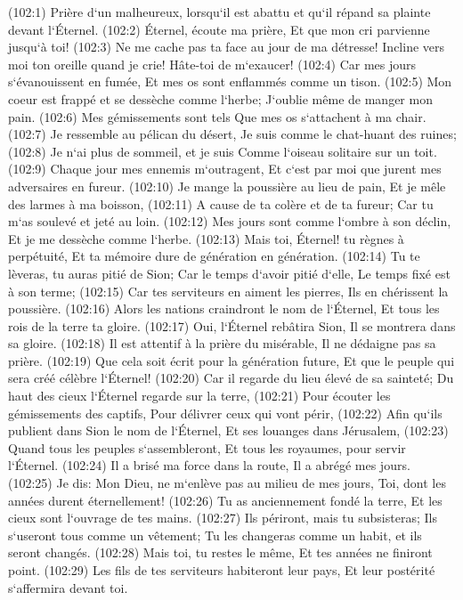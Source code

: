\verse (102:1) Prière d`un malheureux, lorsqu`il est abattu et qu`il répand sa plainte devant l`Éternel. (102:2) Éternel, écoute ma prière, Et que mon cri parvienne jusqu`à toi! 
\verse (102:3) Ne me cache pas ta face au jour de ma détresse! Incline vers moi ton oreille quand je crie! Hâte-toi de m`exaucer! 
\verse (102:4) Car mes jours s`évanouissent en fumée, Et mes os sont enflammés comme un tison. 
\verse (102:5) Mon coeur est frappé et se dessèche comme l`herbe; J`oublie même de manger mon pain. 
\verse (102:6) Mes gémissements sont tels Que mes os s`attachent à ma chair. 
\verse (102:7) Je ressemble au pélican du désert, Je suis comme le chat-huant des ruines; 
\verse (102:8) Je n`ai plus de sommeil, et je suis Comme l`oiseau solitaire sur un toit. 
\verse (102:9) Chaque jour mes ennemis m`outragent, Et c`est par moi que jurent mes adversaires en fureur. 
\verse (102:10) Je mange la poussière au lieu de pain, Et je mêle des larmes à ma boisson, 
\verse (102:11) A cause de ta colère et de ta fureur; Car tu m`as soulevé et jeté au loin. 
\verse (102:12) Mes jours sont comme l`ombre à son déclin, Et je me dessèche comme l`herbe. 
\verse (102:13) Mais toi, Éternel! tu règnes à perpétuité, Et ta mémoire dure de génération en génération. 
\verse (102:14) Tu te lèveras, tu auras pitié de Sion; Car le temps d`avoir pitié d`elle, Le temps fixé est à son terme; 
\verse (102:15) Car tes serviteurs en aiment les pierres, Ils en chérissent la poussière. 
\verse (102:16) Alors les nations craindront le nom de l`Éternel, Et tous les rois de la terre ta gloire. 
\verse (102:17) Oui, l`Éternel rebâtira Sion, Il se montrera dans sa gloire. 
\verse (102:18) Il est attentif à la prière du misérable, Il ne dédaigne pas sa prière. 
\verse (102:19) Que cela soit écrit pour la génération future, Et que le peuple qui sera créé célèbre l`Éternel! 
\verse (102:20) Car il regarde du lieu élevé de sa sainteté; Du haut des cieux l`Éternel regarde sur la terre, 
\verse (102:21) Pour écouter les gémissements des captifs, Pour délivrer ceux qui vont périr, 
\verse (102:22) Afin qu`ils publient dans Sion le nom de l`Éternel, Et ses louanges dans Jérusalem, 
\verse (102:23) Quand tous les peuples s`assembleront, Et tous les royaumes, pour servir l`Éternel. 
\verse (102:24) Il a brisé ma force dans la route, Il a abrégé mes jours. 
\verse (102:25) Je dis: Mon Dieu, ne m`enlève pas au milieu de mes jours, Toi, dont les années durent éternellement! 
\verse (102:26) Tu as anciennement fondé la terre, Et les cieux sont l`ouvrage de tes mains. 
\verse (102:27) Ils périront, mais tu subsisteras; Ils s`useront tous comme un vêtement; Tu les changeras comme un habit, et ils seront changés. 
\verse (102:28) Mais toi, tu restes le même, Et tes années ne finiront point. 
\verse (102:29) Les fils de tes serviteurs habiteront leur pays, Et leur postérité s`affermira devant toi. 


